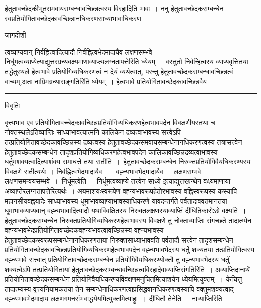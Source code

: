 \documentclass[10pt, openany]{book}
\begin{document}
{हेतुतावच्छेदकीभूतसमवायसम्बन्धावच्छिन्नत्वस्य विरहादिति भावः~। ननु हेतुतावच्छेदकसम्बन्धेन स्वप्रतियोगितावच्छेदकावच्छिन्नानधिकरणसाध्याभावाधिकरण
\newpage
\begin{center} जागदीशी \end{center}
{\la त्वव्याप्यवान् निर्वह्नित्वादित्यादौ निर्वह्नित्वभेदमादायैव लक्षणसम्भवे निर्धूमत्वव्याप्येत्याद्युत्तरग्रन्थवक्ष्यमाणाव्याप्त्यलग्नतापत्तेरिति ध्येयम्~। वस्तुतो निर्वन्हित्वस्य व्याप्यवृत्तितया तद्धेतुस्थले हेत्वभावे प्रतियोगिव्यधिकरणत्वं न देयं व्यर्थत्वात्, परन्तु हेतुतावच्छेदकसम्बन्धावच्छिन्नत्वं वाच्यम्,अतः नाग्रिमग्रन्थासङ्गतिरिति ध्येयम्~। हेत्वभावे
प्रतियोगितावच्छेदकावच्छिन्नवैय}\\
\hrule
\begin{center}     विवृतिः \end{center}
वृत्त्यभाव एव प्रतियोगितावच्चेदकावच्छिन्नप्रतियोगिव्यधिकरणहेत्वभावपदेन विवक्षणीयस्तथा च नोक्तस्थलेऽतिव्याप्तिः साध्याभावत्यात्मनि कालिकेन द्रव्यत्वाभावस्य सत्त्वेऽपि तत्प्रतियोगितावच्छेदकावच्छिन्नस्य द्रव्यत्वस्य हेतुतावच्छेदकसमवायसम्बन्धेनानधिकरणत्वस्य तत्रासत्त्वेन हेतुतावच्छेदकसम्बन्धेन तादृशप्रतियोगिव्यधिकरणहेत्वभावपदेन कालिकावच्छिन्नद्रव्यत्वाभावस्य धर्तुमशक्यत्वादित्याशंक्य समाधत्ते तथा सतीति~।~हेतुतावच्छेदकसम्बन्धेन निरुक्तप्रतियोगिवैयधिकरण्यस्य विवक्षणे सतीत्यर्थः~। निर्वह्नित्वभेदमादायैव $=$ वह्न्यभावभेदमादायैव~। लक्षणसम्भवे $=$ लक्षणसमन्वयसम्भवे~।~{\la निर्धूमत्वेति~।} निर्धूमत्वव्याप्ये तत्त्वेन साध्ये {\qt इत्याद्युत्तरग्रन्थेन वक्ष्यमाणाया अव्याप्तेरलग्नतापत्तेरित्यर्थः}~। अयमाशयःस्वरूपेण वह्न्यभावरूपहेतोरभावस्य वह्निस्वरूपस्य कस्यापि महानसीयवह्नयादेः साध्याभावस्य धूमाभावव्याप्याभावस्याधिकरणे यावदन्तर्गते पर्वतादाववतमानतया धूमाभावव्याप्यवान् वह्न्यभावादित्यादौ यथाविवक्षितस्य निरुक्तलक्षणस्याव्याप्तिं दीधितिकारोऽग्रे वक्ष्यति~। हेतुतावच्छेदकसम्बन्धेन निरुक्तप्रतियोगिव्यधिकरणहेत्वभावस्य विवक्षणे तु नोक्ताव्याप्तिः संगच्छते तादात्म्येन वह्न्यभावभेदप्रतियोगितावच्छेदकवह्न्यभावत्वावच्छिन्नस्य वह्न्यभावस्य हेतुतावच्छेदकस्वरूपसम्बन्धेनानधिकरणताया निरुक्तसाध्याभाववति पर्वतादौ सत्त्वेन तादृशसम्बन्धेन प्रतियोगितावच्छेदकावच्छिन्नप्रतियोगिव्यधिकरणहेत्वभावपदेन वह्न्यभावभेदस्य धर्तेु  शक्यतया तत्प्रतियोगित्वस्य वह्न्यभावे सत्त्वात् \textendash प्रतियोगितावच्छेदकसम्बन्धेन प्रतियोगिवैयधिकरण्योक्तौ तु वह्न्यभावभेदस्य धर्तुं शक्यत्वेऽपि तत्प्रतियोगितायां हेतुतावच्छेदकसम्बन्धावच्छिन्नत्वविरहादेवाव्याप्तिसंगतिरिति~।
अव्याप्तिदानार्थे प्रतियोगितावच्छेदकसम्बन्धेन प्रतियोगिवैयधिकरण्यविवक्षणमनुचितमित्याशयेन ध्येयमित्युक्तम्~।~{\la केचित्तु} तादात्म्यस्य वृत्त्यनियामकतया तेन
सम्बन्धेनाधिकरणत्वाप्रसिद्धवानधिकरणत्वस्यापि वक्तुमशक्यत्वाद् वह्न्यभावभेदमादाय लक्षणगमनसंभवाद्धयेयमित्युक्तमित्याहुः~।~{\la दीधितौ तेनेति~।} नाव्याप्तिरिति
}
\end{document}
